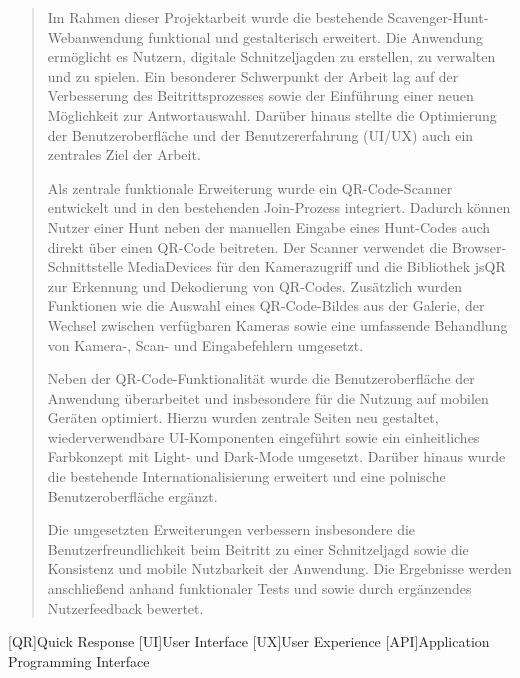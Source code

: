 ﻿\documentclass[oneside]{ausarbeitung}
\begin{document}
\begin{abstract}

Im Rahmen dieser Projektarbeit wurde die bestehende Scavenger-Hunt-Webanwendung funktional und gestalterisch erweitert.
Die Anwendung ermöglicht es Nutzern, digitale Schnitzeljagden zu erstellen, zu verwalten und zu spielen.
Ein besonderer Schwerpunkt der Arbeit lag auf der Verbesserung des Beitrittsprozesses sowie der Einführung einer neuen 
Möglichkeit zur Antwortauswahl. Darüber hinaus stellte die Optimierung der Benutzeroberfläche und der Benutzererfahrung 
(UI/UX) auch ein zentrales Ziel der Arbeit.

Als zentrale funktionale Erweiterung wurde ein QR-Code-Scanner entwickelt und in den bestehenden Join-Prozess integriert.
Dadurch können Nutzer einer Hunt neben der manuellen Eingabe eines Hunt-Codes auch direkt über einen QR-Code beitreten.
Der Scanner verwendet die Browser-Schnittstelle MediaDevices für den Kamerazugriff und die Bibliothek jsQR zur Erkennung 
und Dekodierung von QR-Codes. Zusätzlich wurden Funktionen wie die Auswahl eines QR-Code-Bildes aus der Galerie, der Wechsel 
zwischen verfügbaren Kameras sowie eine umfassende Behandlung von Kamera-, Scan- und Eingabefehlern umgesetzt.

Neben der QR-Code-Funktionalität wurde die Benutzeroberfläche der Anwendung überarbeitet und insbesondere für die Nutzung
auf mobilen Geräten optimiert. Hierzu wurden zentrale Seiten neu gestaltet, wiederverwendbare UI-Komponenten eingeführt
sowie ein einheitliches Farbkonzept mit Light- und Dark-Mode umgesetzt. Darüber hinaus wurde die bestehende 
Internationalisierung erweitert und eine polnische Benutzeroberfläche ergänzt.

Die umgesetzten Erweiterungen verbessern insbesondere die Benutzerfreundlichkeit beim Beitritt zu einer Schnitzeljagd sowie
die Konsistenz und mobile Nutzbarkeit der Anwendung. Die Ergebnisse werden anschließend anhand funktionaler Tests und sowie 
durch ergänzendes Nutzerfeedback bewertet.


\end{abstract}
\cleardoublepage
\tableofcontents

\listoffigures

\listoftables

\lstlistoflistings

\listofabbreviations
\begin{acronym}[MediaDevices]  %


  [QR]{Quick Response}
  [UI]{User Interface}
  [UX]{User Experience}
  [API]{Application Programming Interface}
\end{acronym}
\end{document}
